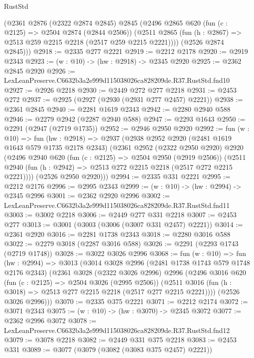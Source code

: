 \begin{lexlean}{RustStd}
\begin{coremodule}
      (@2361
        @2876
        (@2322 @2874 @2845)
        @2845
        (@2496
          @2865
          @620
          (fun (c : @2125) => @2504 @2874 (@2844 @2506))
          (@2511 @2865 (fun (h : @2867) => @2513 @259 @2215 @2218 (@2517 @259 @2215 @2221))))
        (@2526 @2874 @2845)))
@2918 := @2335 @277 @2221
@2919 := @2212 @2178
@2920 := @2919 @2343
@2923 := (w : @10) -> (hw : @2918) -> @2345 @2920
@2925 := @2362 @2845 @2920
@2926 := LexLeanPreserve.C6632b3a2e999d115038026ca828209de.R37.RustStd.fnd10
@2927 := @2926 @2218
@2930 := @2449 @272 @277 @2218
@2931 := @2453 @272
@2937 := @2925 (@2927 (@2930 (@2931 @277 @2457) @2221))
@2938 := @2361 @2845
@2940 := @2281 @1619 @2343
@2942 := @2280 @2940 @588
@2946 := @2279 @2942 (@2287 @2940 @588)
@2947 := @2293 @1643
@2950 := @2291 (@2947 (@2719 @1735))
@2952 := @2946 @2950 @2920
@2992 := fun (w : @10) =>
  fun (hw : @2918) =>
  @2937
    (@2938
      @2952
      @2920
      (@2481 @1619 @1643 @579 @1735 @2178 @2343)
      (@2361
        @2952
        (@2322 @2950 @2920)
        @2920
        (@2496
          @2940
          @620
          (fun (c : @2125) => @2504 @2950 (@2919 @2506))
          (@2511 @2940 (fun (h : @2942) => @2513 @272 @2215 @2218 (@2517 @272 @2215 @2221))))
        (@2526 @2950 @2920)))
@2994 := @2335 @331 @2221
@2995 := @2212 @2176
@2996 := @2995 @2343
@2999 := (w : @10) -> (hw : @2994) -> @2345 @2996
@3001 := @2362 @2920 @2996
@3002 := LexLeanPreserve.C6632b3a2e999d115038026ca828209de.R37.RustStd.fnd11
@3003 := @3002 @2218
@3006 := @2449 @277 @331 @2218
@3007 := @2453 @277
@3013 := @3001 (@3003 (@3006 (@3007 @331 @2457) @2221))
@3014 := @2361 @2920
@3016 := @2281 @1738 @2343
@3018 := @2280 @3016 @588
@3022 := @2279 @3018 (@2287 @3016 @588)
@3026 := @2291 (@2293 @1743 (@2719 @1748))
@3028 := @3022 @3026 @2996
@3068 := fun (w : @10) =>
  fun (hw : @2994) =>
  @3013
    (@3014
      @3028
      @2996
      (@2481 @1738 @1743 @579 @1748 @2176 @2343)
      (@2361
        @3028
        (@2322 @3026 @2996)
        @2996
        (@2496
          @3016
          @620
          (fun (c : @2125) => @2504 @3026 (@2995 @2506))
          (@2511 @3016 (fun (h : @3018) => @2513 @277 @2215 @2218 (@2517 @277 @2215 @2221))))
        (@2526 @3026 @2996)))
@3070 := @2335 @375 @2221
@3071 := @2212 @2174
@3072 := @3071 @2343
@3075 := (w : @10) -> (hw : @3070) -> @2345 @3072
@3077 := @2362 @2996 @3072
@3078 := LexLeanPreserve.C6632b3a2e999d115038026ca828209de.R37.RustStd.fnd12
@3079 := @3078 @2218
@3082 := @2449 @331 @375 @2218
@3083 := @2453 @331
@3089 := @3077 (@3079 (@3082 (@3083 @375 @2457) @2221))

\end{coremodule}
\end{lexlean}
